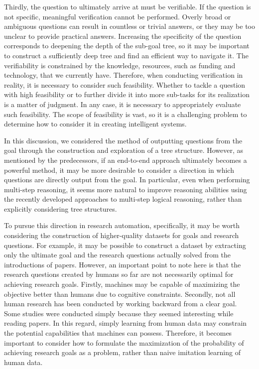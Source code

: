 \documentclass{book}
\begin{document}
Thirdly, the question to ultimately arrive at must be verifiable. If the question is not specific, meaningful verification cannot be performed. Overly broad or ambiguous questions can result in countless or trivial answers, or they may be too unclear to provide practical answers. Increasing the specificity of the question corresponds to deepening the depth of the sub-goal tree, so it may be important to construct a sufficiently deep tree and find an efficient way to navigate it. The verifiability is constrained by the knowledge, resources, such as funding and technology, that we currently have. Therefore, when conducting verification in reality, it is necessary to consider such feasibility. Whether to tackle a question with high feasibility or to further divide it into more sub-tasks for its realization is a matter of judgment. In any case, it is necessary to appropriately evaluate such feasibility. The scope of feasibility is vast, so it is a challenging problem to determine how to consider it in creating intelligent systems.

In this discussion, we considered the method of outputting questions from the goal through the construction and exploration of a tree structure. However, as mentioned by the predecessors, if an end-to-end approach ultimately becomes a powerful method, it may be more desirable to consider a direction in which questions are directly output from the goal. In particular, even when performing multi-step reasoning, it seems more natural to improve reasoning abilities using the recently developed approaches to multi-step logical reasoning, rather than explicitly considering tree structures. 

To pursue this direction in research automation, specifically, it may be worth considering the construction of higher-quality datasets for goals and research questions. For example, it may be possible to construct a dataset by extracting only the ultimate goal and the research questions actually solved from the introductions of papers. However, an important point to note here is that the research questions created by humans so far are not necessarily optimal for achieving research goals. Firstly, machines may be capable of maximizing the objective better than humans due to cognitive constraints. Secondly, not all human research has been conducted by working backward from a clear goal. Some studies were conducted simply because they seemed interesting while reading papers. In this regard, simply learning from human data may constrain the potential capabilities that machines can possess. Therefore, it becomes important to consider how to formulate the maximization of the probability of achieving research goals as a problem, rather than naive imitation learning of human data.
\end{document}
